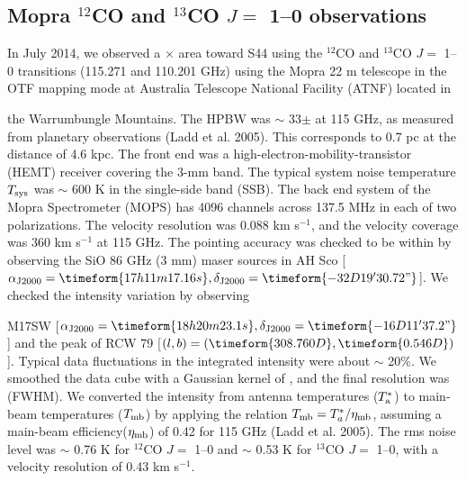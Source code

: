\documentclass[onecolumn]{pasj01}
\begin{document}
\subsection{Mopra $^{12}$CO {and} $^{13}$CO $J=$ 1--0 observations}
{In July 2014, we observed a}  $\times$  area toward S44 using {the} $^{12}$CO and $^{13}$CO $J =$ 1--0 transition{s} (115.271 {and} 110.201 GHz) {using the Mopra 22 m telescope in the OTF mapping mode at }{Australia Telescope National Facility (ATNF)} located in {the Warrumbungle Mountains.
{The HPBW {was} $\sim$ 33$\pm$  at 115 GHz{, as} {measured} from planetary observations (Ladd et al. 2005).}  This corresponds to 0.7 pc at the distance of 4.6 kpc. 
The front end was a high-electron-mobility-transistor (HEMT) receiver covering {the} 3-mm band. 
The typical system noise temperature $T_{\rm sys}$ was $\sim$ 600 K in the single-side band (SSB).
The back end system of {the} Mopra Spectrometer ({MOPS}) has 4096 channels across 137.5 MHz in each of two polarization{s. The} velocity resolution was 0.088 km s$^{-1}${,} and the velocity coverage was 360 km s$^{-1}$ at 115 GHz.
The {pointing} accuracy was checked to be within  by observing the SiO 86 GHz (3 mm) maser sources {in} AH Sco [$\alpha_{\rm J2000} =\timeform{17h11m17.16s}, \delta_{\rm J2000} = \timeform{-32D19'30.72"}$].
{We checked} the intensity variation by observing {M17SW [$\alpha_{\rm J2000} =\timeform{18h20m23.1s}, \delta_{\rm J2000} = \timeform{-16D11'37.2"}$] and the peak of RCW 79 [$(l,b) = (\timeform{308.760D}, \timeform{0.546D})$].
{Typical data fluctuations in the integrated intensity were about $\sim$ 20\%}. 
{We smoothed} the data cube with a Gaussian kernel of , and the final {resolution {was}}  (FWHM).
We converted {the intensity} from antenna temperatures ($T_{\rm a}^*$) {to} main-beam temperature{s} ($T_{\rm mb}$) by {applying {the} relation} $T_{\rm mb}=T_a^*/ \eta_{\rm mb}$, {assuming} a main-beam efficiency($\eta_{\rm mb}$) of 0.42 for 115 GHz (Ladd et al. 2005).
The rms noise level was $\sim$ 0.76 K for $^{12}$CO $J =$ 1--0 and $\sim$ 0.53 K for $^{13}$CO $J =$ 1--0, with a velocity resolution of 0.43 km s$^{-1}$.

}}
\end{document}
